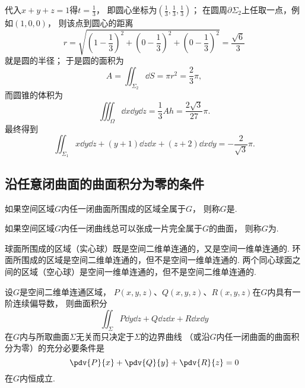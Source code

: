 \begin{example}
\begin{solution}
代入\(x+y+z=1\)得\(t=\frac13\)，
即圆心坐标为\((\frac13,\frac13,\frac13)\)；
在圆周\(\partial\Sigma_2\)上任取一点，例如\((1,0,0)\)，
则该点到圆心的距离\begin{equation*}
	r = \sqrt{
		\left( 1-\frac13 \right)^2
		+ \left( 0-\frac13 \right)^2
		+ \left( 0-\frac13 \right)^2
	}
	= \frac{\sqrt6}3
\end{equation*}
就是圆的半径；
于是圆的面积为\begin{equation*}
	A = \iint_{\Sigma_2} \dd{S}
	= \pi r^2
	= \frac23 \pi,
\end{equation*}
而圆锥的体积为\begin{equation*}
	\iiint_\Omega \dd{x}\dd{y}\dd{z}
	= \frac13 A h
	= \frac{2\sqrt3}{27} \pi.
\end{equation*}
最终得到\begin{equation*}
	\iint_{\Sigma_1} x \dd{y}\dd{z} + (y+1) \dd{z}\dd{x} + (z+2) \dd{x}\dd{y}
	= -\frac2{\sqrt3} \pi.
\end{equation*}
\end{solution}
\end{example}

\subsection{沿任意闭曲面的曲面积分为零的条件}
\begin{definition}
如果空间区域\(G\)内任一闭曲面所围成的区域全属于\(G\)，
则称\(G\)是.
\end{definition}

\begin{definition}
如果空间区域\(G\)内任一闭曲线总可以张成一片完全属于\(G\)的曲面，
则称\(G\)为.
\end{definition}

\begin{example}
球面所围成的区域（实心球）既是空间二维单连通的，又是空间一维单连通的.
环面所围成的区域是空间二维单连通的，但不是空间一维单连通的.
两个同心球面之间的区域（空心球）是空间一维单连通的，但不是空间二维单连通的.
\end{example}

\begin{theorem}\label{theorem:线积分与面积分.沿任意闭曲面的曲面积分为零的条件}
设\(G\)是空间二维单连通区域，
\(P(x,y,z)\)、\(Q(x,y,z)\)、\(R(x,y,z)\)在\(G\)内具有一阶连续偏导数，
则曲面积分\[
	\iint_\Sigma P\dd{y}\dd{z}+Q\dd{z}\dd{x}+R\dd{x}\dd{y}
\]
在\(G\)内与所取曲面\(\Sigma\)无关而只决定于\(\Sigma\)的边界曲线
（或沿\(G\)内任一闭曲面的曲面积分为零）的充分必要条件是\[
	\pdv{P}{x}+\pdv{Q}{y}+\pdv{R}{z} = 0
\]在\(G\)内恒成立.
\end{theorem}

